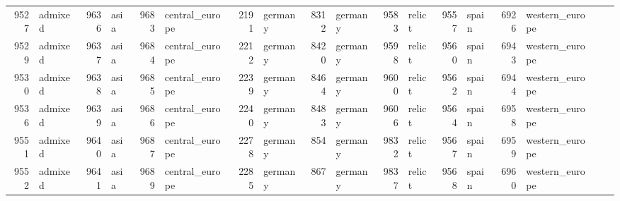 \begin{table}[h]
{\begin{tabular}{rl|rl|rl|rl|rl|rl|rl|rl|rl}
			9527                   & admixed         & 9636                   & asia            & 9683                   & central\_europe & 2191                   & germany         & 8312                   & germany                 & 9583                   & relict                  & 9557                   & spain           & 6926                   & western\_europe &                          &                 \\
			9529                   & admixed         & 9637                   & asia            & 9684                   & central\_europe & 2212                   & germany         & 8420                   & germany                 & 9598                   & relict                  & 9560                   & spain           & 6943                   & western\_europe &                          &                 \\
			9530                   & admixed         & 9638                   & asia            & 9685                   & central\_europe & 2239                   & germany         & 8464                   & germany                 & 9600                   & relict                  & 9562                   & spain           & 6944                   & western\_europe &                          &                 \\
			9536                   & admixed         & 9639                   & asia            & 9686                   & central\_europe & 2240                   & germany         & 8483                   & germany                 & 9606                   & relict                  & 9564                   & spain           & 6958                   & western\_europe &                          &                 \\
			9551                   & admixed         & 9640                   & asia            & 9687                   & central\_europe & 2278                   & germany         & 854                    & germany                 & 9832                   & relict                  & 9567                   & spain           & 6959                   & western\_europe &                          &                 \\
			9552                   & admixed         & 9641                   & asia            & 9689                   & central\_europe & 2285                   & germany         & 867                    & germany                 & 9837                   & relict                  & 9568                   & spain           & 6960                   & western\_europe &                          &                 \\

\end{tabular}}
\end{table}
